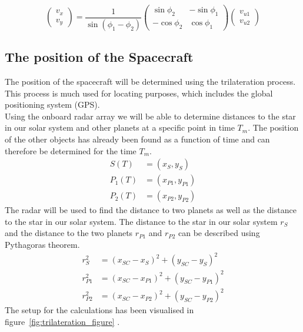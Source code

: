 \documentclass[reprint,english,notitlepage]{revtex4-2}
\begin{document}
\[
    \begin{pmatrix}
        v_x\\
		v_y
    \end{pmatrix}
	 = \frac{1}{\sin\left(\phi_1 - \phi_2 \right)}
	\begin{pmatrix}
	    \sin \phi_2 & -\sin \phi_1\\
		-\cos \phi_2 & \cos \phi_1
	\end{pmatrix}
	\begin{pmatrix}
		v_{u1}\\ v_{u2}
	\end{pmatrix}
\]


\subsection{The position of the Spacecraft}\label{subsec:the-position-of-the-spacecraft}
The position of the spacecraft will be determined using the trilateration process.
This process is much used for locating purposes, which includes the global positioning system (GPS).\\
Using the onboard radar array we will be able to determine distances to the star in our solar system and other planets at a specific point in time $T_m$.
The position of the other objects has already been found as a function of time and can therefore be determined for the time $T_m$.\\
\begin{align*}
    S\left(T \right) &= \left(x_S, y_S \right)\\
	P_1\left(T \right) &= \left(x_{P1}, y_{P1} \right)\\
	P_2\left(T \right) &= \left(x_{P2}, y_{P2} \right)
\end{align*}
The radar will be used to find the distance to two planets as well as the distance to the star in our solar system.
The distance to the star in our solar system $r_S$ and the distance to the two planets $r_{P1}$ and $r_{P2}$ can be described using Pythagoras theorem.
\begin{align}
    r_S^2 &= (x_{SC} - x_S)^2 + (y_{SC} - y_S)^2 \label{r_s}\\
	r_{P1}^2 &= (x_{SC} - x_{P1})^2 + (y_{SC} - y_{P1})^2 \label{r_p1}\\
	r_{P2}^2 &= (x_{SC} - x_{P2})^2 + (y_{SC} - y_{P2})^2  \label{r_p2}
\end{align}
The setup for the calculations has been visualised in figure~\ref{fig:trilateration_figure} .
\end{document}
